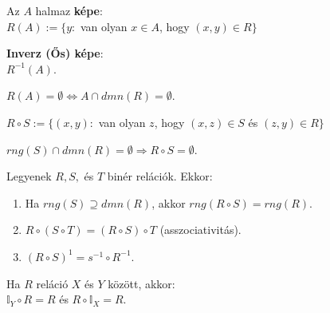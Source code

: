 \begin{frame}
\begin{tcolorbox}[title={Def.: Az $A$ halmaz képe, (ős)képe / inverz képe}]
Az $A$ halmaz \textbf{képe}:\\
$R(A) := \{ y :$ van olyan $x \in A$, hogy $(x, y) \in R \}$\\
\mmedskip

\textbf{Inverz (Ős) képe}:\\
$R^{-1}(A)$.
\end{tcolorbox}

\begin{tcolorbox}[title={Ész}]
$R(A) = \emptyset \iff A \cap dmn(R) = \emptyset$.
\end{tcolorbox}

\begin{tcolorbox}[title={Def.: Az $S$ és $R$ binér relációk kompozíciója}]
$R \circ S := \{ (x, y) : $ van olyan $z$, hogy $(x, z) \in S$ és $(z, y) \in R \}$
\end{tcolorbox}

\begin{tcolorbox}[title={Ész}]
$rng(S) \cap dmn(R) = \emptyset \Rightarrow R \circ S = \emptyset$.
\end{tcolorbox}

\begin{tcolorbox}[title={Def.: Kompozíció tulajdonságai}]
Legyenek $R, S,$ és $T$ binér relációk. Ekkor:\\
\begin{enumerate}
\item Ha $rng(S) \supseteq dmn(R)$, akkor $rng(R \circ S) = rng(R)$.
\item $R \circ (S \circ T) = (R \circ S) \circ T$ (asszociativitás).
\item $(R \circ S)^{1} = s^{-1} \circ R^{-1}$.
\end{enumerate}

Ha $R$ reláció $X$ és $Y$ között, akkor:\\
$\mathbb{I}_Y \circ R = R$ és $R \circ \mathbb{I}_X = R$.
\end{tcolorbox}
\end{frame}

